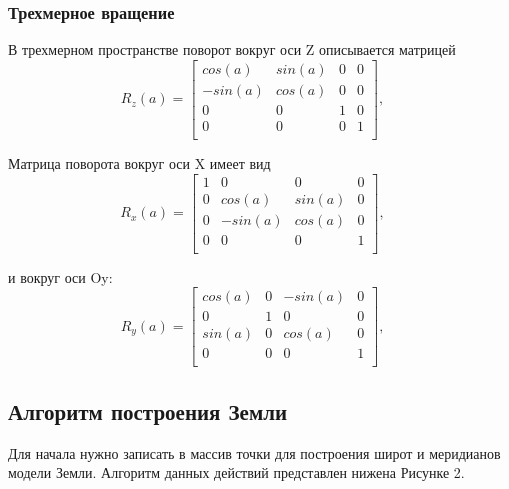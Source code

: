 \documentclass[14pt, a4paper]{extarticle}
\begin{document}
	\subsubsection{Трехмерное вращение}
	В трехмерном пространстве поворот вокруг оси Z описывается матрицей
	$$
	R_z(a) = 
	\begin{bmatrix} 
		cos(a) & sin(a) & 0 & 0 \\
		-sin(a) & cos(a) & 0 & 0 \\
		0 & 0 & 1 & 0 \\
		0 & 0 & 0 & 1 \\
	\end{bmatrix},
	\quad
	$$

	Матрица поворота вокруг оси X имеет вид
	$$
	R_x(a) = 
	\begin{bmatrix} 
		1 & 0 & 0 & 0 \\
		0 & cos(a) & sin(a) & 0 \\
		0 & -sin(a) & cos(a) & 0 \\
		0 & 0 & 0 & 1 \\
	\end{bmatrix},
	\quad
	$$
	
	и вокруг оси Oy:
	$$
	R_y(a) = 
	\begin{bmatrix} 
		cos(a) & 0 & -sin(a) & 0 \\
		0 & 1 & 0 & 0 \\
		sin(a) & 0 & cos(a) & 0 \\
		0 & 0 & 0 & 1 \\
	\end{bmatrix},
	\quad
	$$
		
		
	\subsection{Алгоритм построения Земли}
	Для начала нужно записать в массив точки для построения широт и меридианов модели Земли. Алгоритм данных действий представлен ниже\newline на Рисунке 2.
	
\end{document}
